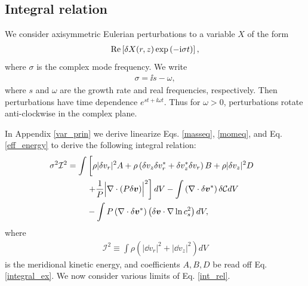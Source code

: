 


\subsection{Integral relation}

We consider axisymmetric Eulerian perturbations to a variable $X$ of
the form  
\begin{align}
 \operatorname{Re}\left[ \delta X(r,z)\exp{\left(-\mathrm{i}\sigma t\right)}\right], 
\end{align}
where $\sigma$ is the complex mode frequency. We 
write 
\begin{align}
  \sigma = \ii s - \omega,
\end{align}
where $s$ and $\omega$ are the growth rate and real frequencies,
respectively. Then perturbations have time dependence $e^{st +
  \ii\omega t}$.  Thus for $\omega>0$, perturbations rotate
anti-clockwise in the complex plane. 

In Appendix \ref{var_prin} we derive linearize Eqs. \ref{masseq}, \ref{momeq}, and 
Eq. \ref{eff_energy} to derive the following integral relation: 
\begin{align}
  \sigma^2\mathcal{I}^2
&= \int\left[ \rho
  |\dd v_r|^2A + \rho  \left(\dd v_z \dd v_r^* + \dd v_z^*\dd v_r\right) B +
  \rho |\dd v_z|^2 D\phantom{\frac{1}{1}}\right. \notag\\
&\phantom{===}  \left. + \frac{1}{P}\Bigl\lvert \nabla\cdot\left(P\dd
  \bm{v}\right)\Bigr\rvert^2\right]dV  -\int \left(\nabla\cdot\dd\bm{v}^*\right)\dd\mathcal{C}dV \notag\\
&\phantom{===}
- \int P
  \left(\nabla\cdot\dd\bm{v}^*\right)\left(\dd\bm{v}\cdot\nabla\ln{c_s^2}\right)dV,\label{int_rel}
\end{align} 
where
\begin{align}
  \mathcal{I}^2 \equiv \int\rho\left(|\dd v_r|^2 + |\dd v_z|^2\right)dV
\end{align}
is the meridional kinetic energy, 
and coefficients $A,B,D$ be
read off Eq. \ref{integral_ex}. %
We now consider various limits of Eq. \ref{int_rel}.    



